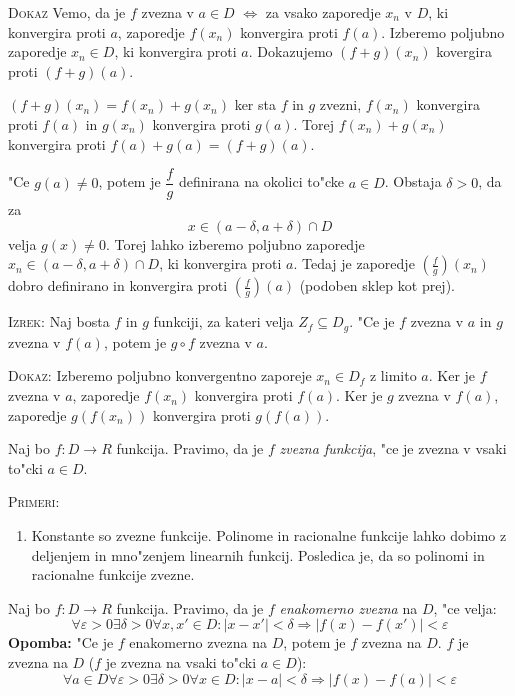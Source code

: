 \textsc{Dokaz} Vemo, da je $f$ zvezna v $a \in D$ $\iff$ za vsako zaporedje $x_n$ v $D$, ki konvergira proti $a$, zaporedje $f(x_n)$ konvergira proti $f(a)$. Izberemo poljubno zaporedje $x_n \in D$, ki konvergira proti $a$. Dokazujemo $(f+g)(x_n)$ kovergira proti $(f+g)(a)$.

$(f+g)(x_n) = f(x_n) + g(x_n)$ ker sta $f$ in $g$ zvezni, $f(x_n)$ konvergira proti $f(a)$ in $g(x_n)$ konvergira proti $g(a)$. Torej $f(x_n) + g(x_n)$ konvergira proti $f(a) + g(a) = (f+g)(a)$.

"Ce $g(a) \neq 0$, potem je $\dfrac{f}{g}$ definirana na okolici to"cke $a \in D$. Obstaja $\delta > 0$, da za
\begin{equation*}
x \in (a - \delta, a + \delta) \cap D
\end{equation*}
velja $g(x) \neq 0$. Torej lahko izberemo poljubno zaporedje $x_n \in (a - \delta, a + \delta) \cap D$, ki konvergira proti $a$. Tedaj je zaporedje $\left(\frac{f}{g}\right)(x_n)$ dobro definirano in konvergira proti $\left(\frac{f}{g}\right)(a)$ (podoben sklep kot prej).

\textsc{Izrek:} Naj bosta $f$ in $g$ funkciji, za kateri velja $Z_f \subseteq D_g$. "Ce je $f$ zvezna v $a$ in $g$ zvezna v $f(a)$, potem je $g \circ f$ zvezna v $a$.

\textsc{Dokaz:} Izberemo poljubno konvergentno zaporeje $x_n \in D_f$ z limito $a$. Ker je $f$ zvezna v $a$, zaporedje $f(x_n)$ konvergira proti $f(a)$. Ker je $g$ zvezna v $f(a)$, zaporedje $g(f(x_n))$ konvergira proti $g(f(a))$.

 Naj bo $f: D \to R$ funkcija. Pravimo, da je $f$ \emph{zvezna funkcija}, "ce je zvezna v vsaki to"cki $a \in D$.

\textsc{Primeri:}
\begin{enumerate}[1)]
	\item Konstante so zvezne funkcije. Polinome in racionalne funkcije lahko dobimo z deljenjem in mno"zenjem linearnih funkcij. Posledica je, da so polinomi in racionalne funkcije zvezne.
\end{enumerate}
%
 Naj bo $f: D \to R$ funkcija. Pravimo, da je $f$ \emph{enakomerno zvezna} na $D$, "ce velja:
\begin{equation*}
\forall \varepsilon > 0 \exists \delta > 0 \forall x, x' \in D: |x - x'| < \delta \Rightarrow |f(x) - f(x')| < \varepsilon
\end{equation*}
\textbf{Opomba:} "Ce je $f$ enakomerno zvezna na $D$, potem je $f$ zvezna na $D$. $f$ je zvezna na $D$ ($f$ je zvezna na vsaki to"cki $a \in D$):
\begin{equation*}
\forall a \in D \forall \varepsilon > 0 \exists \delta > 0 \forall x \in D: |x-a| < \delta \Rightarrow |f(x) - f(a)| < \varepsilon
\end{equation*}

